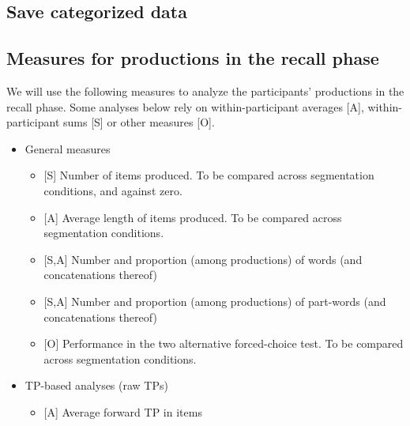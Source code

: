 \documentclass[]{article}
\providecommand{\tightlist}{%
  \setlength{\itemsep}{0pt}\setlength{\parskip}{0pt}}
\begin{document}
\subsection{Save categorized data}\label{save-categorized-data}

\subsection{Measures for productions in the recall
phase}\label{measures-for-productions-in-the-recall-phase}

We will use the following measures to analyze the participants'
productions in the recall phase. Some analyses below rely on
within-participant averages {[}A{]}, within-participant sums {[}S{]} or
other measures {[}O{]}.

\begin{itemize}
\tightlist
\item
  General measures

  \begin{itemize}
  \tightlist
  \item
    {[}S{]} Number of items produced. To be compared across segmentation
    conditions, and against zero.
  \item
    {[}A{]} Average length of items produced. To be compared across
    segmentation conditions.
  \item
    {[}S,A{]} Number and proportion (among productions) of words (and
    concatenations thereof)
  \item
    {[}S,A{]} Number and proportion (among productions) of part-words
    (and concatenations thereof)
  \item
    {[}O{]} Performance in the two alternative forced-choice test. To be
    compared across segmentation conditions.
  \end{itemize}
\item
  TP-based analyses (raw TPs)

  \begin{itemize}
  \tightlist
  \item
    {[}A{]} Average forward TP in items


\end{itemize}
\end{itemize}
\end{document}
